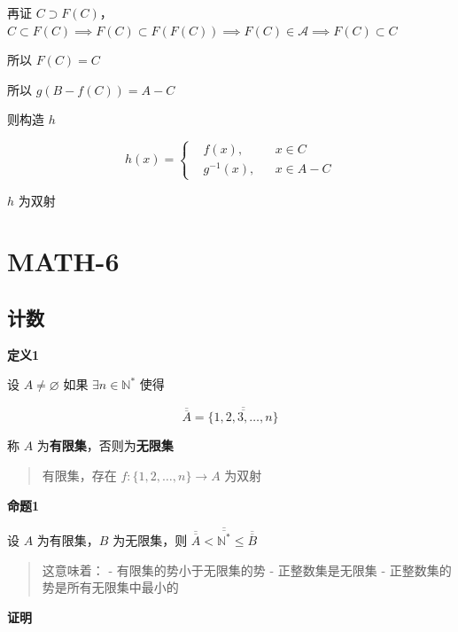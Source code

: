再证
\(C \supset F(C)\)，\(C\subset F(C)\implies F(C)\subset F(F(C))\implies F(C)\in \mathscr{A}\implies F(C)\subset C\)

所以 \(F(C)=C\)

所以 \(g(B-f(C))=A-C\)

则构造 \(h\)

\[
h(x)=\left\{
\begin{aligned}
&f(x), &&x \in C\\
&g^{-1}(x), &&x \in A-C
\end{aligned}
\right.
\]

\(h\) 为双射

\section{MATH-6}\label{math-6}

\subsection{计数}\label{ux8ba1ux6570-1}

\textbf{定义1}

设 \(A\neq\varnothing\) 如果 \(\exists n \in \mathbb{N}^*\) 使得

\[
\overline{\overline{A}}=\overline{\overline{\{1,2,3,\dots,n \}}}
\]

称 \(A\) 为\textbf{有限集}，否则为\textbf{无限集}

\begin{quote}
有限集，存在 \(f:\{ 1,2,\dots,n \}\to A\) 为双射
\end{quote}

\textbf{命题1}

设 \(A\) 为有限集，\(B\) 为无限集，则
\(\overline{\overline{A}}<\overline{\overline{\mathbb{N}^*}}\leq\overline{\overline{B}}\)

\begin{quote}
这意味着： - 有限集的势小于无限集的势 - 正整数集是无限集 -
正整数集的势是所有无限集中最小的
\end{quote}

\textbf{证明}

